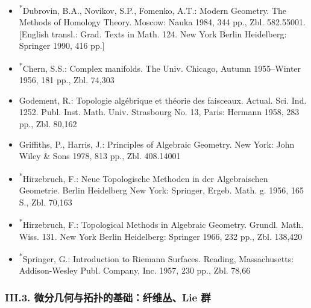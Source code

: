 \begin{itemize}
\item \textsuperscript{*}Dubrovin, B.A., Novikov, S.P., Fomenko, A.T.: Modern Geometry. The Methods of Homology Theory. Moscow: Nauka 1984, 344 pp., Zbl. 582.55001. [English transl.: Grad. Texts in Math. 124. New York Berlin Heidelberg: Springer 1990, 416 pp.]
\item \textsuperscript{*}Chern, S.S.: Complex manifolds. The Univ. Chicago, Autumn 1955--Winter 1956, 181 pp., Zbl. 74,303
\item Godement, R.: Topologie algébrique et théorie des faisceaux. Actual. Sci. Ind. 1252. Publ. Inst. Math. Univ. Strasbourg No. 13, Paris: Hermann 1958, 283 pp., Zbl. 80,162
\item Griffiths, P., Harris, J.: Principles of Algebraic Geometry. New York: John Wiley \& Sons 1978, 813 pp., Zbl. 408.14001
\item \textsuperscript{*}Hirzebruch, F.: Neue Topologische Methoden in der Algebraischen Geometrie. Berlin Heidelberg New York: Springer, Ergeb. Math. g. 1956, 165 S., Zbl. 70,163
\item \textsuperscript{*}Hirzebruch, F.: Topological Methods in Algebraic Geometry. Grundl. Math. Wiss. 131. New York Berlin Heidelberg: Springer 1966, 232 pp., Zbl. 138,420
\item \textsuperscript{*}Springer, G.: Introduction to Riemann Surfaces. Reading, Massachusetts: Addison-Wesley Publ. Company, Inc. 1957, 230 pp., Zbl. 78,66
\end{itemize}

\subsubsection*{III.3. 微分几何与拓扑的基础：纤维丛、Lie 群}

